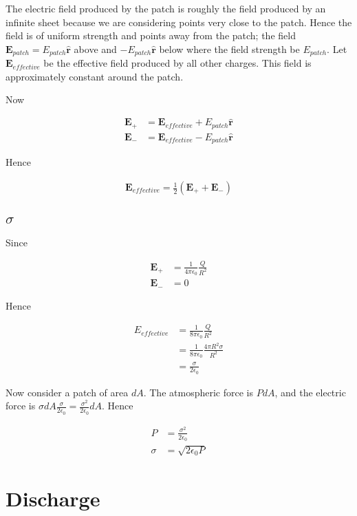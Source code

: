 \documentclass{article}
\newcommand{\half}{\frac{1}{2}}
\newcommand{\mb}{\mathbf}
\begin{document}
The electric field produced by the patch is roughly the field produced by an infinite sheet because we are considering points very close to the patch. Hence the field is of uniform strength and points away from the patch; the field $\mb{E}_{patch} = E_{patch}\mb{\hat{r}}$ above and $-E_{patch}\mb{\hat{r}}$ below where the field strength be $E_{patch}$. Let $\mb{E}_{effective}$ be the effective field produced by all other charges. This field is approximately constant around the patch.

Now

\begin{align*}
\mb{E}_+ &= \mb{E}_{effective} + E_{patch}\mb{\hat{r}} \\
\mb{E}_- &= \mb{E}_{effective} - E_{patch}\mb{\hat{r}}
\end{align*}

Hence

\begin{align*}
\mb{E}_{effective} = \half (\mb{E}_+ + \mb{E}_-)
\end{align*}

\subsection{$\sigma$}

Since

\begin{align*}
\mb{E}_+ &= \frac{1}{4\pi\epsilon_0} \frac{Q}{R^2} \\
\mb{E}_- &= 0
\end{align*}

Hence

\begin{align*}
E_{effective} &= \frac{1}{8\pi\epsilon_0} \frac{Q}{R^2} \\
&= \frac{1}{8\pi\epsilon_0} \frac{4\pi R^2\sigma}{R^2} \\
&= \frac{\sigma}{2\epsilon_0}
\end{align*}

Now consider a patch of area $dA$. The atmospheric force is $PdA$, and the electric force is $\sigma dA \frac{\sigma}{2\epsilon_0} = \frac{\sigma^2}{2\epsilon_0} dA$. Hence

\begin{align*}
P &= \frac{\sigma^2}{2\epsilon_0} \\
\sigma &= \sqrt{2\epsilon_0 P}
\end{align*}

\section{Discharge}
\end{document}
